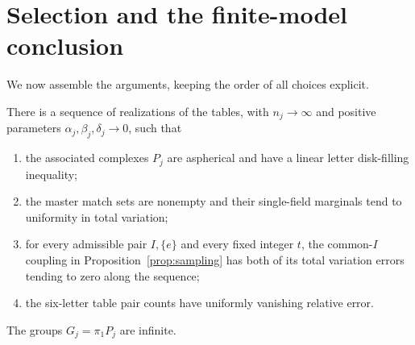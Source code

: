 \section{Selection and the finite-model conclusion}\label{sec:completion}
We now assemble the arguments, keeping the order of all choices explicit.

\begin{lemma}\label{lem:completion-diagonal}
There is a sequence of realizations of the tables, with $n_j\to\infty$ and positive parameters $\alpha_j,\beta_j,\delta_j\to0$, such that
\begin{enumerate}[label=\textup{(\roman*)}]
\item the associated complexes $P_j$ are aspherical and have a linear letter disk-filling inequality;
\item the master match sets are nonempty and their single-field marginals tend to uniformity in total variation;
\item for every admissible pair $I,\{e\}$ and every fixed integer $t$, the common-$I$ coupling in Proposition~\ref{prop:sampling} has both of its total variation errors tending to zero along the sequence;
\item the six-letter table pair counts have uniformly vanishing relative error.
\end{enumerate}
The groups $G_j=\pi_1P_j$ are infinite.
\end{lemma}
